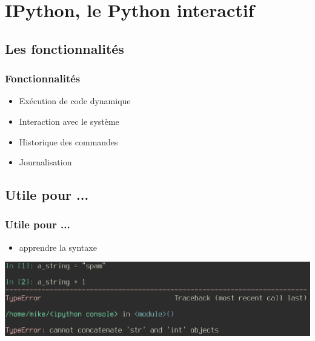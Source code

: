 \section{IPython, le Python interactif}
\subsection{Les fonctionnalités}

\begin{frame}
  \frametitle{Fonctionnalités}
  \begin{itemize}
    \item Exécution de code dynamique
    \item Interaction avec le système
    \item Historique des commandes
    \item Journalisation
  \end{itemize}
\end{frame}

\subsection{Utile pour ...}
\begin{frame}[fragile]
  \frametitle{Utile pour ...}
    \begin{itemize}
      \item apprendre la syntaxe
    \end{itemize}
  \includegraphics[scale=0.35]{apprendre.png}

\end{frame}

